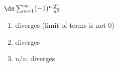 {$\ds \sum_{n=1}^\infty (-1)^{n}\frac{2^n}{n^2}$
}
{\begin{enumerate}
	\item diverges (limit of terms is not 0)
	\item	diverges
	\item n/a; diverges
\end{enumerate}
}